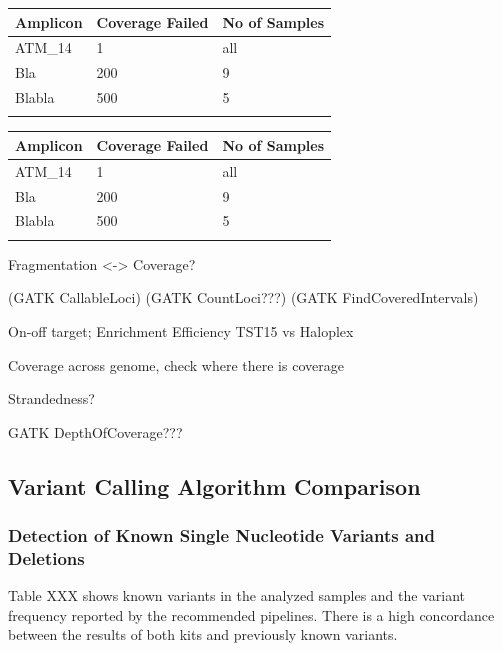 \begin{minipage}{0.5\textwidth}
\begin{tabular}{p{1.5cm} p{1.5cm} p{1.5cm}}\\
\hline
Amplicon & Coverage Failed & No of Samples \\
\hline
ATM_14 & 1 & all \\
Bla & 200 & 9 \\
Blabla & 500 & 5 \\
\label{failed_hpx}
\end{tabular}
\end{minipage}
\hfill
\begin{minipage}{0.5\textwidth}
\begin{tabular}{p{3cm} p{1.5cm} p{1.5cm}}\\
\hline
Amplicon & Coverage Failed & No of Samples \\
\hline
ATM_14 & 1 & all \\
Bla & 200 & 9 \\
Blabla & 500 & 5 \\
\label{failed_tst}
\end{tabular}
\end{minipage}

Fragmentation <-> Coverage?

(GATK CallableLoci)
(GATK CountLoci???)
(GATK FindCoveredIntervals)

On-off target; Enrichment Efficiency TST15 vs Haloplex

Coverage across genome, check where there is coverage

Strandedness?

GATK DepthOfCoverage???

\subsection{Variant Calling Algorithm Comparison}

\subsubsection{Detection of Known Single Nucleotide Variants and Deletions}

Table XXX shows known variants in the analyzed samples and the variant frequency
reported by the recommended pipelines. There is a high concordance between  the
results of both kits and previously known variants.

